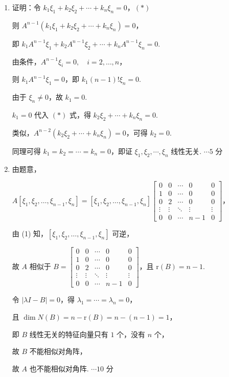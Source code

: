 \documentclass[a4paper,11pt]{ctexart}
\newcommand{\rk}{\mathrm{r}}
\newcommand{\score}[1]{\hfill$\cdots\text{#1 分}$}
\begin{document}
\begin{enumerate}[label=(\arabic*), leftmargin=2.4em, itemsep=0.35em, topsep=0.3em]
  \item 证明：令 $k_1\xi_1 + k_2\xi_2 + \cdots + k_n\xi_n = 0$，\hfill $(*)$

  则 $A^{n-1}(k_1\xi_1 + k_2\xi_2 + \cdots + k_n\xi_n) = 0$，

  即 $k_1 A^{n-1}\xi_1 + k_2 A^{n-1}\xi_2 + \cdots + k_n A^{n-1}\xi_n = 0$.

  由条件，$A^{n-1}\xi_i = 0,\quad i = 2, \dots, n$，

  则 $k_1 A^{n-1}\xi_1 = 0$，即 $k_1(n-1)!\xi_n = 0$.

  由于 $\xi_n \neq 0$，故 $k_1 = 0$.

  $k_1 = 0$ 代入 $(*)$ 式，得 $k_2\xi_2 + \cdots + k_n\xi_n = 0$.

  类似，$A^{n-2}(k_2\xi_2 + \cdots + k_n\xi_n) = 0$，可得 $k_2 = 0$.

  同理可得 $k_1 = k_2 = \cdots = k_n = 0$，即证 $\xi_1, \xi_2, \cdots, \xi_n$ 线性无关. \score{5}

  \item 由题意，

  $A[\xi_1, \xi_2, \dots, \xi_{n-1}, \xi_n] = [\xi_1, \xi_2, \dots, \xi_{n-1}, \xi_n]\begin{bmatrix} 0 & 0 & \cdots & 0 & 0 \\ 1 & 0 & \cdots & 0 & 0 \\ 0 & 2 & \cdots & 0 & 0 \\ \vdots & \vdots & \ddots & \vdots & \vdots \\ 0 & 0 & \cdots & n-1 & 0 \end{bmatrix}$，

  由 (1) 知，$[\xi_1, \xi_2, \dots, \xi_{n-1}, \xi_n]$ 可逆，

  故 $A$ 相似于 $B = \begin{bmatrix} 0 & 0 & \cdots & 0 & 0 \\ 1 & 0 & \cdots & 0 & 0 \\ 0 & 2 & \cdots & 0 & 0 \\ \vdots & \vdots & \ddots & \vdots & \vdots \\ 0 & 0 & \cdots & n-1 & 0 \end{bmatrix}$，且 $\rk(B) = n - 1$.

  令 $|\lambda I - B| = 0$，得 $\lambda_1 = \cdots = \lambda_n = 0$，

  且 $\dim N(B) = n - \rk(B) = n - (n - 1) = 1$，

  即 $B$ 线性无关的特征向量只有 $1$ 个，没有 $n$ 个，

  故 $B$ 不能相似对角阵，

  故 $A$ 也不能相似对角阵. \score{10}
\end{enumerate}
\end{document}
